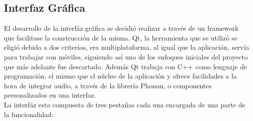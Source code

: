 \subsection{Interfaz Gráfica}


El desarrollo de la interfáz gráfica se decidió realizar a través de un framework que facilitase la construcción de la misma. Qt, la herramienta que se utilizó se eligió debido a dos criterios, era multiplataforma, al igual que la aplicación, servía para trabajar con móviles, siguiendo así uno de los enfoques iniciales del proyecto que más adelante fue descartado. Además Qt trabaja con C++ como lenguaje de programación, el mismo que el núcleo de la aplicación y ofrece facilidades a la hora de integrar audio, a través de la librería Phonon, o componentes personalizados en una interfaz.\\
\newline
La interfáz esta compuesta de tres pestañas cada una encargada de una parte de la funcionalidad:

